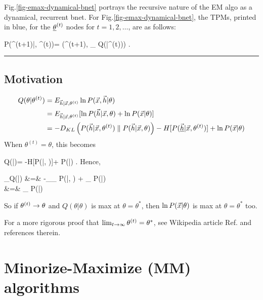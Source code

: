 Fig.\ref{fig-emax-dynamical-bnet}
portrays the 
recursive nature of 
the EM algo as a dynamical, recurrent bnet.
For Fig.\ref{fig-emax-dynamical-bnet},
the TPMs, printed in blue,
for the
$\underline{\theta}^{(t)}$
nodes for $t=1, 2, \ldots$, are
as follows:

\beq\color{blue}
P(\theta^{(t+1)}|\vecx, \theta^{(t)})=
\delta(\theta^{(t+1)}, \argmax_\theta
 Q(\theta|\theta^{(t)}))
\;.
\eeq

\hrule
\subsection{Motivation}

\begin{align}
Q(\theta|\theta^{(t)})
&=
E_{{\vec{h}}|{\vec{x}},\theta^{(t)}}
\ln P({\vec{x}},{\vec{h}}|\theta)
\\
&=
E_{{\vec{h}}|{\vec{x}},\theta^{(t)}}[
\ln P({\vec{h}}|{\vec{x}}, \theta) 
+\ln P({\vec{x}}|\theta)]
\\
&=
-D_{KL}\left(
P({\vec{h}}|{\vec{x}}, \theta^{(t)}) 
\parallel
P({\vec{h}}|{\vec{x}}, \theta)
\right) 
-H[P(\underline{{\vec{h}}}|{\vec{x}}, \theta^{(t)})]
+\ln P({\vec{x}}|\theta)
\label{eq-Q-decomposed}
\end{align}
When $\theta^{(t)}=\theta$,
this becomes

\beq
Q(\theta|\theta)=
-H[P(\ul{\vech}|\vecx, \theta)]+
\ln P(\vecx|\theta)
\;.
\eeq
Hence, 

\beqa
\partial_\theta Q(\theta|\theta)
&=&
-\sum_{\vech}\partial_\theta
P(\ul{\vech}|\vecx, \theta)
+
\partial_\theta
\ln P(\vecx|\theta)
\\
&=&
\partial_\theta
\ln P(\vecx|\theta)
\eeqa

So if $\theta^{(t)}\rightarrow \theta$
and $Q(\theta|\theta)$ is max at $\theta=\theta^*$,
then $\ln P({\vec{x}}|\theta)$
is max at $\theta=\theta^*$ too.

For a  more rigorous proof
that $\lim_{t\rightarrow \infty}\theta^{(t)}
=\theta^*$,
see Wikipedia article Ref.\cite{wiki-em}
and references therein.

\section{Minorize-Maximize (MM) algorithms}


